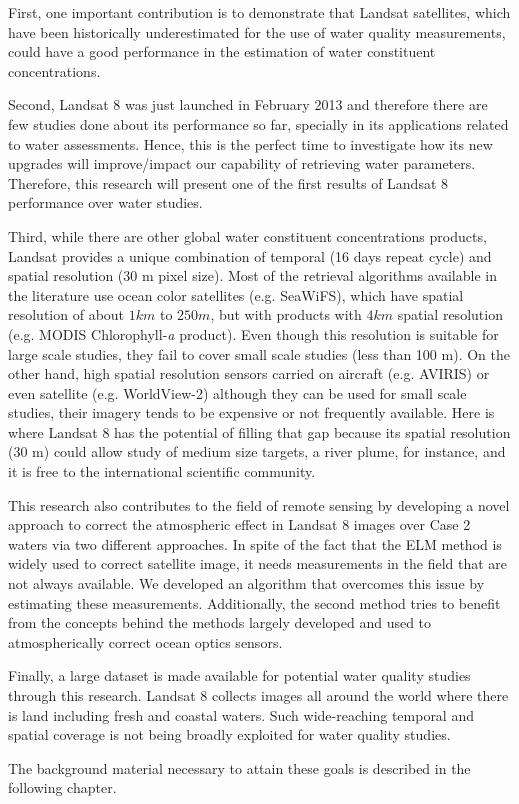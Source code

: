First, one important contribution is to demonstrate that Landsat satellites, which have been historically underestimated for the use of water quality measurements, could have a good performance in the estimation of water constituent concentrations.

Second, Landsat 8 was just launched in February 2013 and therefore there are few studies done about its performance so far, specially in its applications related to water assessments. Hence, this is the perfect time to investigate how its new upgrades will improve/impact our capability of retrieving water parameters. Therefore, this research will present one of the first results of Landsat 8 performance over water studies.  

Third, while there are other global water constituent concentrations products, Landsat provides a unique combination of temporal (16 days repeat cycle) and spatial resolution (30 m pixel size). Most of the retrieval algorithms available in the literature use ocean color satellites (e.g. SeaWiFS), which have spatial resolution of about $1 km$ to $250 m$, but with products with $4km$ spatial resolution (e.g. MODIS Chlorophyll-{\it a} product). Even though this resolution is suitable for large scale studies, they fail to cover small scale studies (less than 100 m). On the other hand, high spatial resolution sensors carried on aircraft (e.g. AVIRIS) or even satellite (e.g. WorldView-2) although they can be used for small scale studies, their imagery tends to be expensive or not frequently available. Here is where Landsat 8 has the potential of filling that gap because its spatial resolution (30 m) could allow study of medium size targets, a river plume, for instance, and it is free to the international scientific community.

This research also contributes to the field of remote sensing by developing a novel approach to correct the atmospheric effect in Landsat 8 images over Case 2 waters via two different approaches. In spite of the fact that the ELM method is widely used to correct satellite image, it needs measurements in the field that are not always available. We developed an algorithm that overcomes this issue by estimating these measurements. Additionally, the { \color{red} second method} tries to benefit from the concepts behind the methods largely developed and used to atmospherically correct ocean optics sensors.

Finally, a large dataset is made available for potential water quality studies through this research. Landsat 8 collects images all around the world where there is land including fresh and coastal waters. Such wide-reaching temporal and spatial coverage is not being broadly exploited for water quality studies.

The background material necessary to attain these goals is described in the following chapter.

